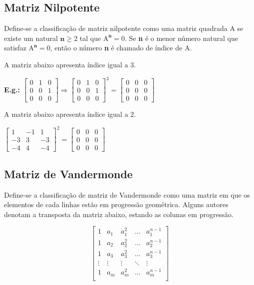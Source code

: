 \documentclass[a4paper,12pt]{article}
\begin{document}
\subsection{Matriz Nilpotente}
Define-se a classificação de matriz nilpotente como uma matriz quadrada $\text{A}$ se existe um natural $ \textbf{n} \geq 2 $ tal que $ \text{A}^{\textbf{n}} = 0 $. Se \textbf{n} é o menor número natural que satisfaz $ \text{A}^{\textbf{n}} = 0 $, então o número \textbf{n} é chamado de índice de $ \text{A} $.

A matriz abaixo apresenta índice igual a $ 3 $.

\textbf{E.g.:} $ \begin{bmatrix}
0 & 1 & 0\\
0 & 0 & 1\\
0 & 0 & 0 
\end{bmatrix}  \Rightarrow  \begin{bmatrix}
0 & 1 & 0\\
0 & 0 & 1\\
0 & 0 & 0 
\end{bmatrix} ^{3} =  \begin{bmatrix}
0 & 0 & 0\\
0 & 0 & 0\\
0 & 0 & 0 
\end{bmatrix} $

A matriz abaixo apresenta índice igual a 2.

$ \begin{bmatrix}
1 & -1 & 1\\
-3 & 3 & -3\\
-4 & 4 & -4
\end{bmatrix}^{2} = \begin{bmatrix}
 0 & 0 & 0\\
 0 & 0 & 0\\
 0 & 0 & 0
\end{bmatrix}$

\subsection{Matriz de Vandermonde}

Define-se a classificação de matriz de Vandermonde como uma matriz em que os elementos de cada linhas estão em progressão geométrica. Alguns autores denotam a transposta da matriz abaixo, estando as colunas em progressão.

$$ \begin{bmatrix}
1 & a_1 & a_1^2 & \dots & a_1^{n-1}\\
1 & a_2 & a_2^2 & \dots & a_2^{n-1}\\
1 & a_3 & a_3^2 & \dots & a_3^{n-1}\\
\vdots & \vdots & \vdots & \ddots &\vdots \\
1 & a_m & a_m^2 & \dots & a_m^{n-1}\\
\end{bmatrix} $$
\end{document}
